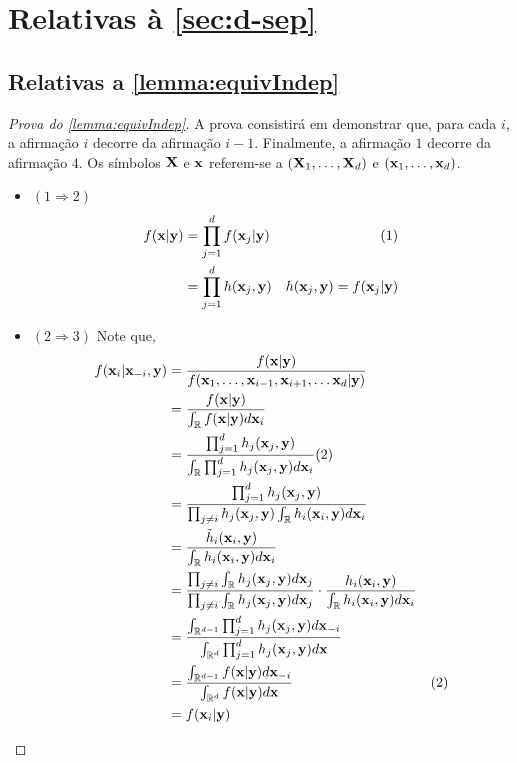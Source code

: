 \section{Relativas à \cref{sec:d-sep}}

\subsection{Relativas a \cref{lemma:equivIndep}}

\begin{proof}[Prova do \cref{lemma:equivIndep}]
 A prova consistirá em demonstrar que,
 para cada $i$, a afirmação $i$ decorre da afirmação $i-1$.
 Finalmente, a afirmação $1$ decorre da afirmação $4$.
 Os símbolos ${\mathbf{X}}$ e ${\mathbf{x}}$ referem-se a 
 $({\mathbf{X}}_1,\ldots,{\mathbf{X}}_d)$ e $({\mathbf{x}}_1,\ldots,{\mathbf{x}}_d)$. 
 \begin{itemize}
  \item $(1 \Longrightarrow 2)$
	\begin{align*}
	 f({\mathbf{x}}|{\mathbf{y}})	&= \prod_{j=1}^{d}{f({\mathbf{x}}_j|{\mathbf{y}})}  & (1) \\
	          &= \prod_{j=1}^{d}{h({\mathbf{x}}_j,{\mathbf{y}})}
	          & h({\mathbf{x}}_j,{\mathbf{y}}) = f({\mathbf{x}}_j|{\mathbf{y}})
	\end{align*}
	\vspace{-5mm}
  \item $(2 \Longrightarrow 3)$ Note que,
	\begin{align*}
	 f({\mathbf{x}}_i|{\mathbf{x}}_{-i},{\mathbf{y}})	
	 &= \frac{f({\mathbf{x}}|{\mathbf{y}})}{f({\mathbf{x}}_1,\ldots,{\mathbf{x}}_{i-1},{\mathbf{x}}_{i+1},\ldots{\mathbf{x}}_d|{\mathbf{y}})}	\\
	 &= \frac{f({\mathbf{x}}|{\mathbf{y}})}{\int_{\mathbb{R}}{f({\mathbf{x}}|{\mathbf{y}})d{\mathbf{x}}_i}} \\
	 &= \frac{\prod_{j=1}^{d}{h_j({\mathbf{x}}_j,{\mathbf{y}})}}
	 {\int_{\mathbb{R}}{\prod_{j=1}^{d}{h_j({\mathbf{x}}_j,{\mathbf{y}})}d{\mathbf{x}}_i}} (2) \\
	 &= \frac{\prod_{j=1}^{d}{h_j({\mathbf{x}}_j,{\mathbf{y}})}}
	 {\prod_{j \neq i}{h_j({\mathbf{x}}_j,{\mathbf{y}})} \int_{\mathbb{R}}{h_i({\mathbf{x}}_i,{\mathbf{y}})d{\mathbf{x}}_i}}	\\
	 &= \frac{\tilde{h}_i({\mathbf{x}}_i,{\mathbf{y}})}{\int_{\mathbb{R}}{h_i({\mathbf{x}}_i,{\mathbf{y}})d{\mathbf{x}}_i}}	\\
	 &= \frac{\prod_{j \neq i}{\int_{\mathbb{R}}{h_j({\mathbf{x}}_j,{\mathbf{y}})d{\mathbf{x}}_j}}}
	 {\prod_{j \neq i}{\int_{\mathbb{R}}{h_j({\mathbf{x}}_j,{\mathbf{y}})d{\mathbf{x}}_j}}} \cdot 
	 \frac{h_i({\mathbf{x}}_i,{\mathbf{y}})}{\int_{\mathbb{R}}{h_i({\mathbf{x}}_i,{\mathbf{y}})d{\mathbf{x}}_i}}	\\
	 &= \frac{\int_{\mathbb{R}^{d-1}}{\prod_{j=1}^{d}{h_j({\mathbf{x}}_j,{\mathbf{y}})}d{\mathbf{x}}_{-i}}}
	 {\int_{\mathbb{R}^{d}}{\prod_{j=1}^{d}{h_j({\mathbf{x}}_j,{\mathbf{y}})}d{\mathbf{x}}}}	\\
	 &= \frac{\int_{\mathbb{R}^{d-1}}{f({\mathbf{x}}|{\mathbf{y}})d{\mathbf{x}}_{-i}}}
	 {\int_{\mathbb{R}^{d}}{f({\mathbf{x}}|{\mathbf{y}})d{\mathbf{x}}}} & (2) \\
	 &= f({\mathbf{x}}_i|{\mathbf{y}})
	\end{align*}


\end{itemize}
\end{proof}
